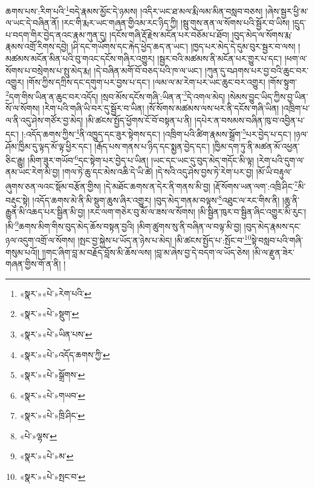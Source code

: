 ཆགས་པས་:རིག་པའི་\footnote{«སྣར་»«པེ་»རེག་པའི་}བདེ་རྣམས་མྱོང་དེ་ཉམས། །འདིར་ཡང་ཐ་མལ་རྨི་ལམ་མིན་བསླབ་བཅས། །ཞེས་སྦྱར་ཕྱི་མ་ལ་ཡང་དེ་བཞིན་ནོ། །རང་གི་རྨར་ཡང་གཞན་གྱིའམ་རང་ཉིད་ཀྱི། །སྦུ་གུས་ནན་ལ་སོགས་པའི་སྦྱོར་བ་ཡིས། །དྲུད་པ་བདག་གིར་བྱེད་ནའང་རྣམ་ཀུན་དུ། །དངོས་གཞི་རྡོ་རྗེས་མངོན་པར་བཅོམ་པ་ཐོབ། །བུད་མེད་ལ་སོགས་རྨ་རྣམས་འགྲོ་རིགས་དབྱེ། །ཤི་དང་གཡོགས་དང་རྐེད་ཕྱེད་ཆད་ན་ཡང་། །ཁྱད་པར་མེད་དེ་དུམ་བུར་སྦྱར་བ་ལས། །མཚམས་མངོན་མིན་པའི་བུ་གའང་དངོས་གཞིར་འགྱུར། །སྦྱར་བའི་མཚམས་ནི་མངོན་པར་གྱུར་པ་དང་། །ཕག་ལ་སོགས་པ་བསྲེགས་པ་སྤུ་མེད་རྨ། །དེ་བཞིན་མགོ་བོ་བཅད་པའི་ཁ་ལ་ཡང་། །ཀུན་དུ་བཤགས་པར་བྱ་བའི་ཆུང་བར་འགྱུར། །གོས་ཀྱིས་དཀྲིས་དང་དགུག་པར་བྱས་པ་དང་། །ལམ་ལ་མ་རེག་པར་ཡང་ཆུང་བར་འགྱུར། །གོས་སྟུག་\footnote{«སྣར་»«པེ་»སྡུག་}དག་གིས་ཡིན་ན་ཆུང་བར་འདོད། །སྲབ་མོས་དངོས་གཞི་:ཡིན་ན་\footnote{«སྣར་»«པེ་»ཡིན་པས་}དེ་འགལ་མེད། །སེམས་བྱུང་ཡིད་ཀྱིས་བྱ་ཡིན་སོ་ལ་སོགས། །རེག་པའི་གཞི་ཡི་བར་དུ་སྦྱོར་བ་ཡིན། །སོ་སོགས་མཚམས་ལས་ཕར་ནི་དངོས་གཞི་ཡིན། །འཁྲིག་པ་ལ་ནི་འདུ་ཤེས་གཙོར་བྱ་མེད། །མི་ཚངས་སྤྱོད་ཕྱོགས་ངོ་བོ་བསྟན་པ་ནི། །དཔེར་ན་བསམས་བཞིན་ཁུ་བ་འབྱིན་པ་དང་། །:འདོད་ཆགས་ཀྱིས་\footnote{«སྣར་»«པེ་»འདོད་ཆགས་ཀྱི་}ནི་འཁྱུད་དང་ཟུར་སྟེགས་དང་། །འཁྲིག་པའི་ཚིག་རྣམས་སྒྲོག་\footnote{«སྣར་»«པེ་»སྒྲོགས་}པར་བྱེད་པ་དང་། །ཉལ་ཤོམ་ཁྱིམ་དུ་ལྟད་མོ་ལྟ་ཕྱིར་དང་། །རྒོད་པས་གནས་པ་ཉིད་དང་སྨྱན་བྱེད་དང་། །ཁྱིམ་དག་ཏུ་ནི་མཚན་མོ་འཕྱན་ཅིང་རྒྱུ། །མིག་ཟུར་གཡོབ་\footnote{«སྣར་»«པེ་»གཡབ་}དང་སྟེག་པར་བྱེད་པ་ཡིན། །ཡང་དང་ཡང་དུ་བུད་མེད་གདོང་མི་ལྟ། །རེག་པའི་དུག་ལ་ནམ་ཡང་རེག་མི་བྱ། །གལ་ཏེ་ཆུ་དང་མེས་འཆི་དེ་ཡི་ཚེ། །དེ་སའི་འདུ་ཤེས་བྱས་ཏེ་རེག་པར་བྱ། །མོ་ཡི་བརྟུལ་ཞུགས་ཅན་ལའང་སྡོམ་བརྩོན་གྱིས། །དེ་མཐོང་ཆགས་ན་དེར་ནི་གནས་མི་བྱ། །རྡོ་སོགས་ཡན་ལག་:འཁྲི་ཤིང་\footnote{«སྣར་»«པེ་»ཁྲི་ཤིང་}མི་བརྡུང་སྟེ། །འདོད་ཆགས་མེ་ནི་མི་སྡུག་ཆུས་ཞིར་འགྱུར། །བུད་མེད་གནམ་བལྟས་\footnote{«པེ་»ལྷས་}འཐུང་ལ་རང་གིས་ནི། །ཆུ་ནི་རྒྱུན་མི་འཆད་པར་སྦྱིན་མི་བྱ། །རང་ལག་གཅེར་བུ་མོ་ལ་ཟས་ལ་སོགས། །མི་སྦྱིན་ཁུར་བ་སྦྱིན་ཞིང་འགྱུར་མི་རུང་། །མི་\footnote{«སྣར་»«པེ་»མ་}ཆགས་མིག་གིས་བུད་མེད་ཆོས་བསྟན་བྱའི། །མིག་ཚུགས་སུ་ནི་བཞིན་ལ་བལྟ་མི་བྱ། །བུད་མེད་རྣམས་དང་ཉལ་འདུག་འགྲོ་ལ་སོགས། །སྤང་བྱ་སྐྱེས་པ་ཡོད་ན་ཉེས་པ་མེད། །མི་ཚངས་སྤྱོད་པ་:སྤོང་བ་\footnote{«སྣར་»«པེ་»སྤང་བ་}སྟེ་བསླབ་པའི་གཞི་གསུམ་པའོ།། །།གང་ཞིག་བླ་མ་བརྗོད་བློས་མི་ཆོས་ལས། །བླ་མ་ཞེས་བྱ་དེ་བདག་ལ་ཡོད་ཅེས། །མི་ལ་རྫུན་ཟེར་གཞན་གྱིས་གོ་ན་ནི། །
